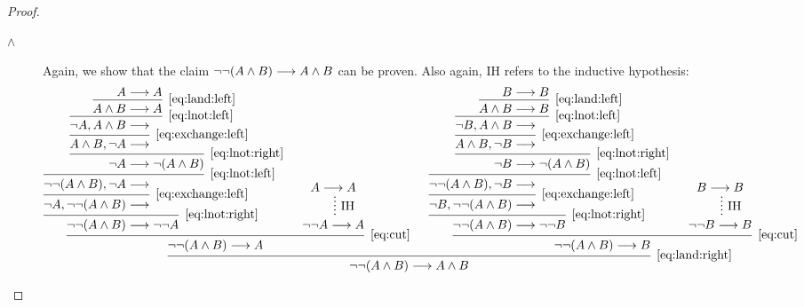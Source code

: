 \documentclass[11pt,a4paper]{article}
\begin{document}
\begin{example}[3.11]
\begin{proof}
\begin{enumerate}
\begin{description}
                    \item[\(\land\)]
                        Again, we show that the claim \(\lnot\lnot(A\land B) \longrightarrow A\land B\) can be proven.
                        Also again, IH refers to the inductive hypothesis:
                        \tiny
                        \begin{equation*}
                            \begin{prooftree}
                                \hypo{A&\seq A}
                                \infer1[\eqref{eq:land:left}]{A\land B&\seq A}
                                \infer1[\eqref{eq:lnot:left}]{\lnot A, A\land B&\seq}
                                \infer1[\eqref{eq:exchange:left}]{A\land B,\lnot A&\seq}
                                \infer1[\eqref{eq:lnot:right}]{\lnot A&\seq\lnot\arcs{ A\land B}}
                                \infer1[\eqref{eq:lnot:left}]{\lnot\lnot\arcs{A\land B}, \lnot A&\seq}
                                \infer1[\eqref{eq:exchange:left}]{\lnot A, \lnot\lnot\arcs{A\land B}&\seq}
                                \infer1[\eqref{eq:lnot:right}]{\lnot\lnot\arcs{A\land B}&\seq\lnot\lnot A}
                                \hypo{A\seq A}
                                \ellipsis{\IH}{\lnot\lnot A\seq A}
                                \infer2[\eqref{eq:cut}]{\lnot\lnot\arcs{A\land B}\seq A}
                                \hypo{B&\seq B}
                                \infer1[\eqref{eq:land:left}]{A\land B&\seq B}
                                \infer1[\eqref{eq:lnot:left}]{\lnot B, A\land B&\seq}
                                \infer1[\eqref{eq:exchange:left}]{A\land B,\lnot B&\seq}
                                \infer1[\eqref{eq:lnot:right}]{\lnot B&\seq\lnot\arcs{ A\land B}}
                                \infer1[\eqref{eq:lnot:left}]{\lnot\lnot\arcs{A\land B}, \lnot B&\seq}
                                \infer1[\eqref{eq:exchange:left}]{\lnot B, \lnot\lnot\arcs{A\land B}&\seq}
                                \infer1[\eqref{eq:lnot:right}]{\lnot\lnot\arcs{A\land B}&\seq\lnot\lnot B}
                                \hypo{B\seq B}
                                \ellipsis{\IH}{\lnot\lnot B\seq B}
                                \infer2[\eqref{eq:cut}]{\lnot\lnot\arcs{A\land B}\seq B}
                                \infer2[\eqref{eq:land:right}]{\lnot\lnot\arcs{A\land B} \seq A\land B}
                            \end{prooftree}
                        \end{equation*}
                        \normalsize

\end{description}
\end{enumerate}
\end{proof}
\end{example}
\end{document}
